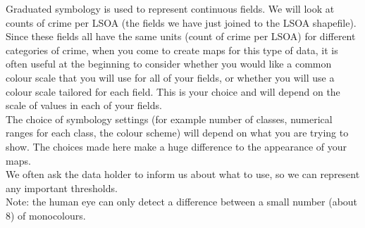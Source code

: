 




Graduated symbology is used to represent continuous fields. We will look at counts of crime per LSOA (the fields we have just joined to the LSOA shapefile).\\

Since these fields all have the same units (count of crime per LSOA) for different categories of crime, when you come to create maps for this type of data, it is often useful at the beginning to consider whether you would like a common colour scale that you will use for all of your fields, or whether you will use a colour scale tailored for each field. This is your choice and will depend on the scale of values in each of your fields.\\
 
The choice of symbology settings (for example number of classes, numerical ranges for each class, the colour scheme) will depend on what you are trying to show. The choices made here make a huge difference to the appearance of your maps.\\

We often ask the data holder to inform us about what to use, so we can represent any important thresholds.\\

Note: the human eye can only detect a difference between a small number (about 8) of monocolours.\\
 
